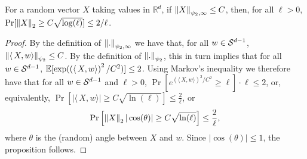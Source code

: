 \begin{proposition}\label{prop: subgaussian means small tail}
    For a random vector $X$ taking values in $\mathbb{R}^d$, if $\left\lVert X\right\rVert_{\psi_2, \infty} \leq C$, then, for all $\ell > 0$, $\Pr[ \left\lVert X\right\rVert_2 \geq C \sqrt{ \log(\ell) } ] \leq 2/\ell$.
\end{proposition}


\begin{proof}
    By the definition of $\left\lVert.\right\rVert_{\psi_2, \infty}$ we have that, for all $w \in \mathcal{S}^{d-1}$,  $\left\lVert \langle\, X , w \rangle\right\rVert_{\psi_2} \leq C$.  By the definition of $\left\lVert.\right\rVert_{\psi_2}$, this in turn implies that for all $w \in \mathcal{S}^{d-1}$, $\operatorname*{\mathbb{E}}[\exp(\left( \langle\, X , w \rangle \right)^2/C^2)] \leq 2$. Using Markov's inequality we therefore have that for all $w \in \mathcal{S}^{d-1}$ and $\ell > 0$, $\Pr[ e^{\left( \langle\, X , w \rangle \right)^2/C^2} \geq \ell ] \cdot \ell \leq 2$, or, equivalently, $\Pr[ | \langle\, X , w \rangle | \geq C \sqrt{ \ln(\ell) } ] \leq \frac{2}{\ell}$, or
    \[
    \Pr\left[ \left\lVert X\right\rVert_2 | \cos(\theta) | \geq C \sqrt{ \ln(\ell) } \right] \leq \frac{2}{\ell},
    \]
    where $\theta$ is the (random) angle between $X$ and $w$. Since $| \cos(\theta) | \leq 1$, the proposition follows.
\end{proof}



